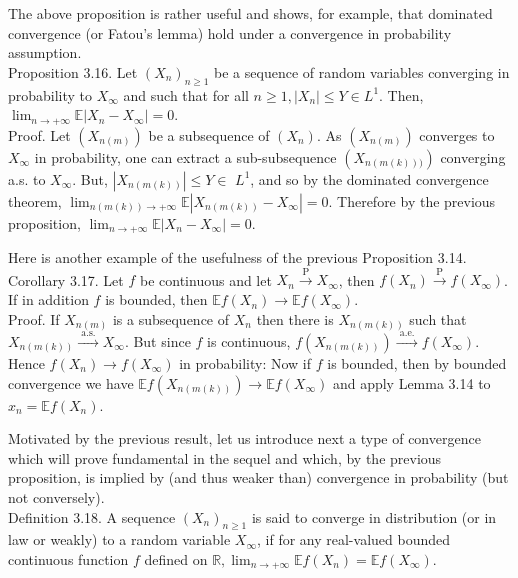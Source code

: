 \documentclass[11pt]{amsbook}
\theoremstyle{plain}%
\theoremstyle{definition}
\theoremstyle{remark}
\begin{document}
The above proposition is rather useful and shows, for example, that dominated convergence (or Fatou's lemma) hold under a convergence in probability assumption.\\
Proposition 3.16. Let $\left(X_{n}\right)_{n \geq 1}$ be a sequence of random variables converging in probability to $X_{\infty}$ and such that for all $n \geq 1,\left|X_{n}\right| \leq Y \in L^{1}$. Then, $\lim _{n \rightarrow+\infty} \mathbb{E}\left|X_{n}-X_{\infty}\right|=0$.\\
Proof. Let $\left(X_{n(m)}\right)$ be a subsequence of $\left(X_{n}\right)$. As $\left(X_{n(m)}\right)$ converges to $X_{\infty}$ in probability, one can extract a sub-subsequence $\left(X_{n(m(k)))}\right)$ converging a.s. to $X_{\infty}$. But, $\left|X_{n(m(k))}\right| \leq Y \in$ $L^{1}$, and so by the dominated convergence theorem, $\lim _{n(m(k)) \rightarrow+\infty} \mathbb{E}\left|X_{n(m(k))}-X_{\infty}\right|=0$. Therefore by the previous proposition, $\lim _{n \rightarrow+\infty} \mathbb{E}\left|X_{n}-X_{\infty}\right|=0$.

Here is another example of the usefulness of the previous Proposition 3.14.\\
Corollary 3.17. Let $f$ be continuous and let $X_{n} \xrightarrow{\mathrm{P}} X_{\infty}$, then $f\left(X_{n}\right) \xrightarrow{\mathrm{P}} f\left(X_{\infty}\right)$. If in addition $f$ is bounded, then $\mathbb{E} f\left(X_{n}\right) \rightarrow \mathbb{E} f\left(X_{\infty}\right)$.\\
Proof. If $X_{n(m)}$ is a subsequence of $X_{n}$ then there is $X_{n(m(k))}$ such that $X_{n(m(k))} \xrightarrow{\text { a.s. }} X_{\infty}$. But since $f$ is continuous, $f\left(X_{n(m(k))}\right) \xrightarrow{\text { a.e. }} f\left(X_{\infty}\right)$. Hence $f\left(X_{n}\right) \rightarrow f\left(X_{\infty}\right)$ in probability: Now if $f$ is bounded, then by bounded convergence we have $\mathbb{E} f\left(X_{n(m(k))}\right) \rightarrow \mathbb{E} f\left(X_{\infty}\right)$ and apply Lemma 3.14 to $x_{n}=\mathbb{E} f\left(X_{n}\right)$.

Motivated by the previous result, let us introduce next a type of convergence which will prove fundamental in the sequel and which, by the previous proposition, is implied by (and thus weaker than) convergence in probability (but not conversely).\\
Definition 3.18. A sequence $\left(X_{n}\right)_{n \geq 1}$ is said to converge in distribution (or in law or weakly) to a random variable $X_{\infty}$, if for any real-valued bounded continuous function $f$ defined on $\mathbb{R}, \lim _{n \rightarrow+\infty} \mathbb{E} f\left(X_{n}\right)=\mathbb{E} f\left(X_{\infty}\right)$.
\end{document}
